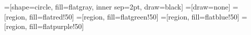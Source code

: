 =[shape=circle, fill=flatgray, inner sep=2pt, draw=black]
=[draw=none]
=[region, fill=flatred!50]
=[region, fill=flatgreen!50]
=[region, fill=flatblue!50]
=[region, fill=flatpurple!50]

\newcommand{\pointgrid}[4]{{
  \newcommand{\argxmin}{#1}
  \newcommand{\argxmax}{#2}
  \newcommand{\argymin}{#3}
  \newcommand{\argymax}{#4}

  \draw[] (\argxmin, 0) to (\argxmax, 0);
  \draw[] (0, \argymin) to (0, \argymax);
  \foreach \x in {\argxmin, ..., \argxmax} {
    \foreach \y in {\argymin, ..., \argymax} {
      \node[point] (\x-\y) at (\x, \y) {};
    }
  }
}}

\newcommand{\subfigwidth}{0.24\columnwidth}
\newcommand{\subfighspace}{0.3cm}
\newcommand{\tikzhspace}{0.4cm}
\newcommand{\tikzscale}{0.75}
\newcommand{\xmin}{-2}
\newcommand{\xmax}{2}
\newcommand{\ymin}{-2}
\newcommand{\ymax}{2}

